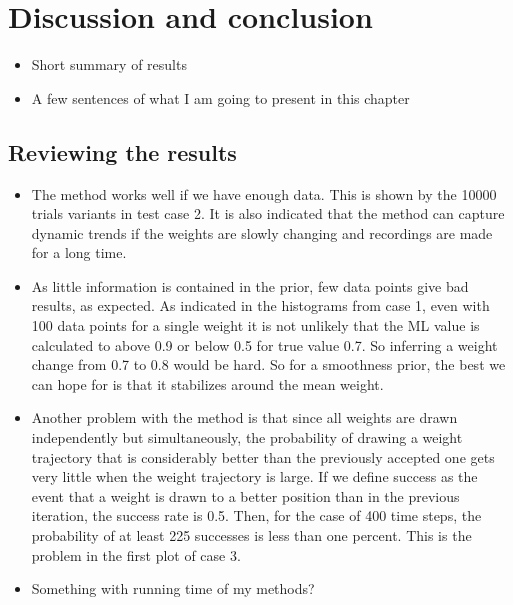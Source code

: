 
\chapter{Discussion and conclusion}
\label{ch:6}

\begin{itemize}
    \item Short summary of results
    \item A few sentences of what I am going to present in this chapter
\end{itemize}

\section{Reviewing the results}

\begin{itemize}
    \item The method works well if we have enough data. This is shown by the 10000 trials variants in test case 2. It is also indicated that the method can capture dynamic trends if the weights are slowly changing and recordings are made for a long time.
    \item As little information is contained in the prior, few data points give bad results, as expected. As indicated in the histograms from case 1, even with 100 data points for a single weight it is not unlikely that the ML value is calculated to above 0.9 or below 0.5 for true value 0.7. So inferring a weight change from 0.7 to 0.8 would be hard. So for a smoothness prior, the best we can hope for is that it stabilizes around the mean weight. 
    \item Another problem with the method is that since all weights are drawn independently but simultaneously, the probability of drawing a weight trajectory that is considerably better than the previously accepted one gets very little when the weight trajectory is large. If we define success as the event that a weight is drawn to a better position than in the previous iteration, the success rate is 0.5. Then, for the case of 400 time steps, the probability of at least 225 successes is less than one percent. This is the problem in the first plot of case 3.  
    \item Something with running time of my methods?
\end{itemize}



